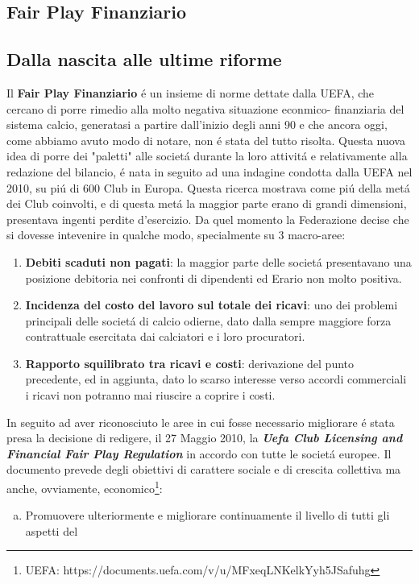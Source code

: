 \documentclass[
    corpo=12pt,
    oneside,
    evenboxes,
    tipotesi=triennale,
    stile=classica,
    oldstyle,
    autoretitolo,
    greek,
]{toptesi}
\begin{document}
\begin{interlinea}{1.5}
\chapter{Fair Play Finanziario}
\section{Dalla nascita alle ultime riforme}
Il \textbf{Fair Play Finanziario} \'e un insieme di norme dettate dalla UEFA, che cercano di porre rimedio alla molto negativa situazione econmico-
finanziaria del sistema calcio, generatasi a partire dall'inizio degli anni 90 e che ancora oggi, come abbiamo avuto modo di notare, non 
\'e stata del tutto risolta.
Questa nuova idea di porre dei "paletti" alle societ\'a durante la loro attivit\'a e relativamente alla redazione del bilancio, \'e
nata in seguito ad una indagine condotta dalla UEFA nel 2010, su pi\'u di 600 Club in Europa. Questa ricerca mostrava come pi\'u della met\'a
dei Club coinvolti, e di questa met\'a la maggior parte erano di grandi dimensioni, presentava ingenti perdite d'esercizio. Da quel momento
la Federazione decise che si dovesse intevenire in qualche modo, specialmente su 3 macro-aree:
\begin{enumerate}
    \item \textbf{Debiti scaduti non pagati}: la maggior parte delle societ\'a presentavano una posizione debitoria nei confronti
    di dipendenti ed Erario non molto positiva.
    \item \textbf{Incidenza del costo del lavoro sul totale dei ricavi}: uno dei problemi principali delle societ\'a di calcio odierne, dato
    dalla sempre maggiore forza contrattuale esercitata dai calciatori e i loro procuratori.
    \item \textbf{Rapporto squilibrato tra ricavi e costi}: derivazione del punto precedente, ed in aggiunta, dato lo scarso interesse verso
    accordi commerciali i ricavi non potranno mai riuscire a coprire i costi.
\end{enumerate}
In seguito ad aver riconosciuto le aree in cui fosse necessario migliorare \'e stata presa la decisione di redigere, il 27 Maggio 2010, la 
\textbf{\emph{Uefa Club Licensing and Financial Fair Play Regulation}} in accordo con tutte le societ\'a europee.
Il documento prevede degli obiettivi di carattere sociale e di crescita collettiva ma anche, ovviamente, economico\footnote{UEFA: https://documents.uefa.com/v/u/MFxeqLNKelkYyh5JSafuhg}:
\begin{enumerate}[(a)]
    \item Promuovere ulteriormente e migliorare continuamente il livello di tutti gli aspetti del

\end{enumerate}
\end{interlinea}
\end{document}
